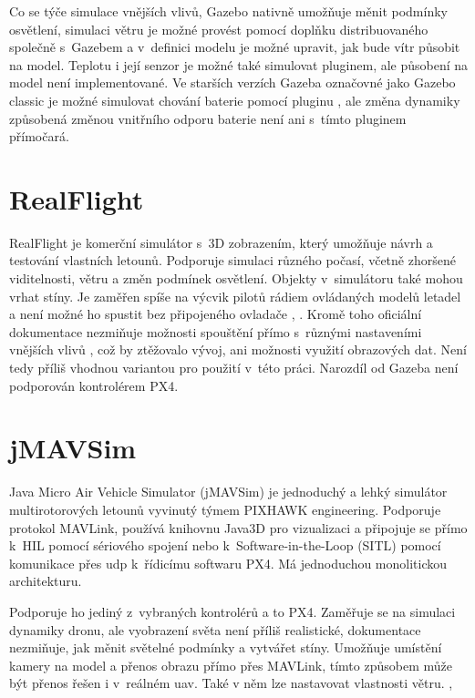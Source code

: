         Co se týče simulace vnějších vlivů, Gazebo nativně umožňuje měnit podmínky osvětlení, simulaci větru je možné provést pomocí doplňku distribuovaného společně s~Gazebem a v~definici modelu je možné upravit, jak bude vítr působit na model. Teplotu i její senzor je možné také simulovat pluginem, ale působení na model není implementované. Ve starších verzích Gazeba označovné jako Gazebo classic je možné simulovat chování baterie pomocí pluginu \cite{batplugin}, ale změna dynamiky způsobená změnou vnitřního odporu baterie není ani s~tímto pluginem přímočará.

    \section{RealFlight} \label{sec:realflight}
        RealFlight je komerční simulátor s~3D zobrazením, který umožňuje návrh a testování vlastních letounů. Podporuje simulaci různého počasí, včetně zhoršené viditelnosti, větru a změn podmínek osvětlení. Objekty v~simulátoru také mohou vrhat stíny. Je zaměřen spíše na výcvik pilotů rádiem ovládaných modelů letadel a není možné ho spustit bez připojeného ovladače \cite{ardupilot:realflight}, \cite{realflight}. Kromě toho oficiální dokumentace nezmiňuje možnosti spouštění přímo s~různými nastaveními vnějších vlivů \cite{realflight}, což by ztěžovalo vývoj, ani možnosti využití obrazových dat. Není tedy příliš vhodnou variantou pro použití v~této práci. Narozdíl od Gazeba není podporován kontrolérem PX4.

    \section{jMAVSim} \label{sec:jmavsim}
        Java Micro Air Vehicle Simulator (jMAVSim) je jednoduchý a lehký simulátor multirotorových letounů vyvinutý týmem PIXHAWK engineering. Podporuje protokol MAVLink, používá knihovnu Java3D pro vizualizaci a připojuje se přímo k~HIL pomocí sériového spojení nebo k~Software-in-the-Loop (SITL) pomocí komunikace přes \acrfull{udp} k~řídicímu softwaru PX4. Má jednoduchou monolitickou architekturu. \cite{Ebeid2018}

        Podporuje ho jediný z~vybraných kontrolérů a to PX4. Zaměřuje se na simulaci dynamiky dronu, ale vyobrazení světa není příliš realistické, dokumentace nezmiňuje, jak měnit světelné podmínky a vytvářet stíny. Umožňuje umístění kamery na model a přenos obrazu přímo přes MAVLink, tímto způsobem může být přenos řešen i v~reálném \acrshort{uav}. Také v něm lze nastavovat vlastnosti větru. \cite{jmavsim}, \cite{px4:jmavsim}

